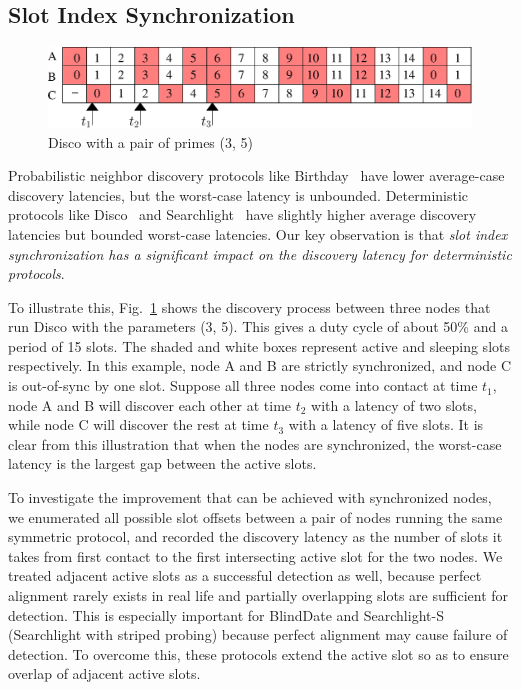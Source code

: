 \documentclass[twoside,twocolumn]{article}
\begin{document}
\subsection{Slot Index Synchronization}

\begin{figure}[t]
   \centering
   \includegraphics[width=.9\columnwidth]{figs/disco_example}
   \caption{Disco with a pair of primes (3, 5)} 
   \label{fig:disco_example}
\end{figure}

Probabilistic neighbor discovery protocols like Birthday~\citep{mcglynn2001birthday} 
have lower average-case discovery latencies, but the worst-case latency 
is unbounded. Deterministic protocols like Disco~\citep{Dutta2008Practical} 
and Searchlight~\citep{bakht2012searchlight} have slightly higher average 
discovery latencies but bounded worst-case latencies. Our key observation 
is that {\em slot index synchronization has a significant impact on the 
discovery latency for deterministic protocols}.

To illustrate this, Fig.~\ref{fig:disco_example} shows the discovery
process between three nodes that run Disco with the parameters (3, 5).
This gives a duty cycle of about 50\% and a period of 15 slots.  The
shaded and white boxes represent active and sleeping slots
respectively.  In this example, node A and B are strictly
synchronized, and node C is out-of-sync by one slot. Suppose all three
nodes come into contact at time $t_1$, node A and B will discover each
other at time $t_2$ with a latency of two slots, while node C will
discover the rest at time $t_3$ with a latency of five slots. It is
clear from this illustration that when the nodes are synchronized, the
worst-case latency is the largest gap between the active slots.

To investigate the improvement that can be achieved with synchronized
nodes, we enumerated all possible slot offsets between a pair of nodes
running the same symmetric protocol, and recorded the discovery
latency as the number of slots it takes from first contact to the
first intersecting active slot for the two nodes. We treated adjacent
active slots as a successful detection as well, because perfect
alignment rarely exists in real life and partially overlapping slots
are sufficient for detection. This is especially important for
BlindDate and Searchlight-S (Searchlight with striped probing) because
perfect alignment may cause failure of detection. To overcome this,
these protocols extend the active slot so as to ensure overlap of
adjacent active slots.
\end{document}

